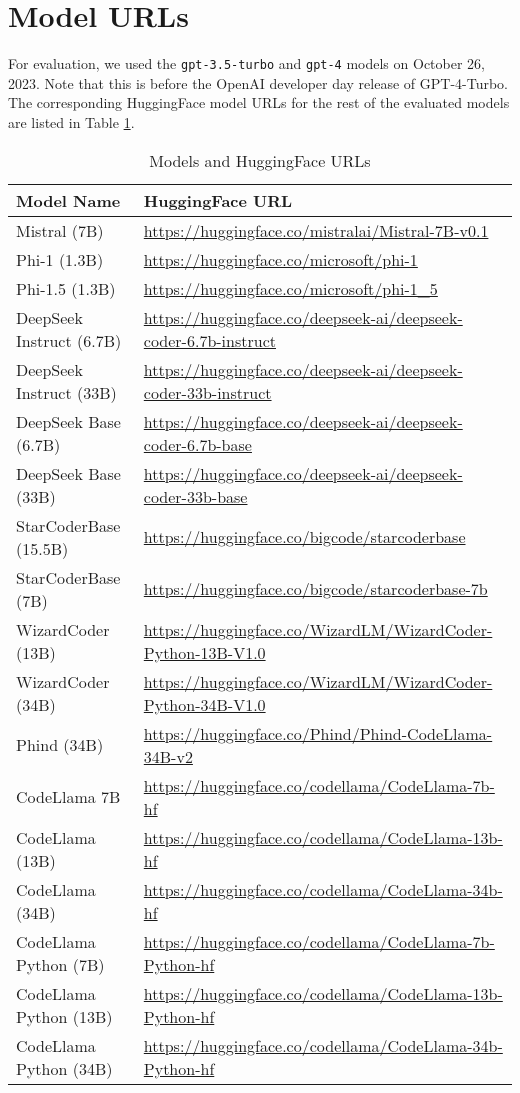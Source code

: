\section{Model URLs}\label{sec:appendix-models}
For evaluation, we used the \texttt{gpt-3.5-turbo} and \texttt{gpt-4} models on October 26, 2023. Note that this is before the OpenAI developer day release of GPT-4-Turbo. The corresponding HuggingFace model URLs for the rest of the evaluated models are listed in Table \ref{tab:model-url-list}.

\begin{table}[h]
    \centering
    \small
    \caption{Models and HuggingFace URLs}
    \begin{tabular}{|ll|}
        \hline
        \textbf{Model Name} & \textbf{HuggingFace URL} \\
        \hline
        Mistral (7B) & \url{https://huggingface.co/mistralai/Mistral-7B-v0.1} \\
        Phi-1 (1.3B) & \url{https://huggingface.co/microsoft/phi-1} \\
        Phi-1.5 (1.3B) & \url{https://huggingface.co/microsoft/phi-1_5} \\
        DeepSeek Instruct (6.7B) & \url{https://huggingface.co/deepseek-ai/deepseek-coder-6.7b-instruct} \\
        DeepSeek Instruct (33B) & \url{https://huggingface.co/deepseek-ai/deepseek-coder-33b-instruct} \\
        DeepSeek Base (6.7B) & \url{https://huggingface.co/deepseek-ai/deepseek-coder-6.7b-base} \\
        DeepSeek Base (33B) & \url{https://huggingface.co/deepseek-ai/deepseek-coder-33b-base} \\
        StarCoderBase (15.5B) & \url{https://huggingface.co/bigcode/starcoderbase} \\
        StarCoderBase (7B) & \url{https://huggingface.co/bigcode/starcoderbase-7b} \\
        WizardCoder (13B) & \url{https://huggingface.co/WizardLM/WizardCoder-Python-13B-V1.0} \\
        WizardCoder (34B) & \url{https://huggingface.co/WizardLM/WizardCoder-Python-34B-V1.0} \\
        Phind (34B) & \url{https://huggingface.co/Phind/Phind-CodeLlama-34B-v2} \\
        CodeLlama 7B & \url{https://huggingface.co/codellama/CodeLlama-7b-hf} \\
        CodeLlama (13B) & \url{https://huggingface.co/codellama/CodeLlama-13b-hf} \\
        CodeLlama (34B) & \url{https://huggingface.co/codellama/CodeLlama-34b-hf} \\
        CodeLlama Python (7B) & \url{https://huggingface.co/codellama/CodeLlama-7b-Python-hf} \\
        CodeLlama Python (13B) & \url{https://huggingface.co/codellama/CodeLlama-13b-Python-hf} \\
        CodeLlama Python (34B) & \url{https://huggingface.co/codellama/CodeLlama-34b-Python-hf} \\
        \hline
    \end{tabular}
    \label{tab:model-url-list}
\end{table}
